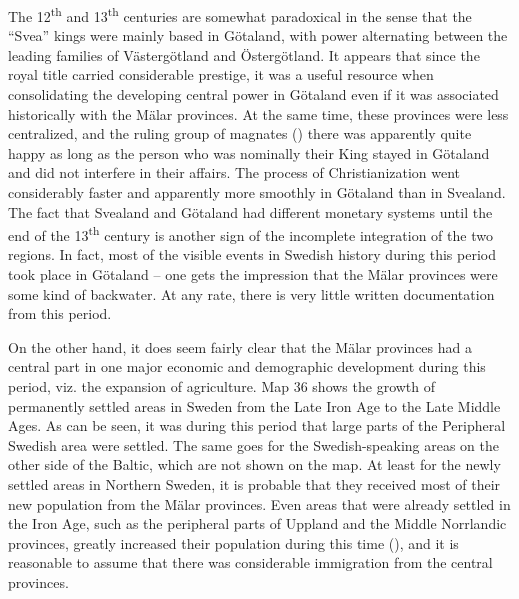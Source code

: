
The 12\textsuperscript{th} and 13\textsuperscript{th} centuries are somewhat paradoxical in the sense that the “Svea” kings were mainly based in Götaland, with power alternating between the leading families of Västergötland and Östergötland. It appears that since the royal title carried considerable prestige, it was a useful resource when consolidating the developing central power in Götaland even if it was associated historically with the Mälar provinces. At the same time, these provinces were less centralized, and the ruling group of magnates () there was apparently quite happy as long as the person who was nominally their King stayed in Götaland and did not interfere in their affairs. The process of Christianization went considerably faster and apparently more smoothly in Götaland than in Svealand. The fact that Svealand and Götaland had different monetary systems until the end of the 13\textsuperscript{th} century is another sign of the incomplete integration of the two regions. In fact, most of the visible events in Swedish history during this period took place in Götaland – one gets the impression that the Mälar provinces were some kind of backwater. At any rate, there is very little written documentation from this period. 


On the other hand, it does seem fairly clear that the Mälar provinces had a central part in one major economic and demographic development during this period, viz. the expansion of agriculture. Map 36 shows the growth of permanently settled areas in Sweden from the Late Iron Age to the Late Middle Ages. As can be seen, it was during this period that large parts of the Peripheral Swedish area were settled. The same goes for the Swedish-speaking areas on the other side of the Baltic, which are not shown on the map. At least for the newly settled areas in Northern Sweden, it is probable that they received most of their new population from the Mälar provinces. Even areas that were already settled in the Iron Age, such as the peripheral parts of Uppland and the Middle Norrlandic provinces, greatly increased their population during this time (\citet{Broberg1990}), and it is reasonable to assume that there was considerable immigration from the central provinces. 

